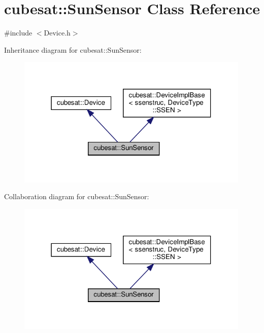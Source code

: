 \hypertarget{classcubesat_1_1SunSensor}{}\section{cubesat\+:\+:Sun\+Sensor Class Reference}
\label{classcubesat_1_1SunSensor}


{\ttfamily \#include $<$Device.\+h$>$}



Inheritance diagram for cubesat\+:\+:Sun\+Sensor\+:
\nopagebreak
\begin{figure}[H]
\begin{center}
\leavevmode
\includegraphics[width=316pt]{classcubesat_1_1SunSensor__inherit__graph}
\end{center}
\end{figure}


Collaboration diagram for cubesat\+:\+:Sun\+Sensor\+:
\nopagebreak
\begin{figure}[H]
\begin{center}
\leavevmode
\includegraphics[width=316pt]{classcubesat_1_1SunSensor__coll__graph}
\end{center}
\end{figure}
